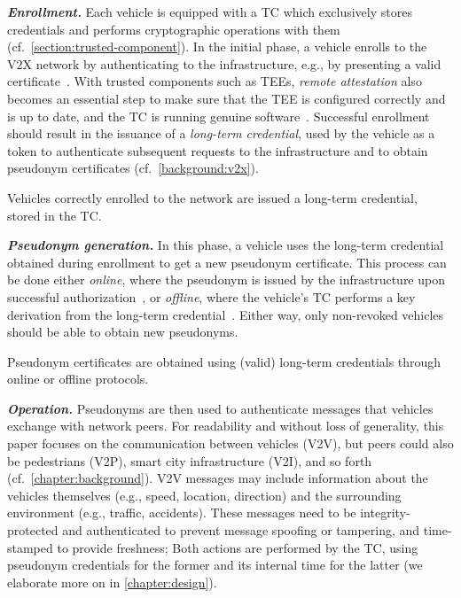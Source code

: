 \noindent\textbf{\emph{Enrollment.}} Each vehicle is equipped with a \ac{TC}
which exclusively stores credentials and performs cryptographic operations with
them (cf.~\cref{section:trusted-component}). In the initial phase, a vehicle
enrolls to the \ac{V2X} network by authenticating to the infrastructure, e.g.,
by presenting a valid certificate~\cite{etsi2022102941}. With trusted components
such as \acp{TEE}, \emph{remote attestation} also becomes an essential step to
make sure that the \ac{TEE} is configured correctly and is up to date, and the
\ac{TC} is running genuine software~\cite{schneider2022sok}. Successful
enrollment should result in the issuance of a \emph{long-term credential}, used
by the vehicle as a token to authenticate subsequent requests to the
infrastructure and to obtain pseudonym certificates (cf.~\cref{background:v2x}).
%
\begin{req}
    \label{req:enrollment}
 Vehicles correctly enrolled to the network are issued a long-term credential,
 stored in the \ac{TC}.
\end{req}
%

\noindent\textbf{\emph{Pseudonym generation.}} In this phase, a vehicle uses the
long-term credential obtained during enrollment to get a new pseudonym
certificate. This process can be done either \emph{online}, where the pseudonym
is issued by the infrastructure upon successful
authorization~\cite{etsi2022102941,brecht2018scms}, or \emph{offline}, where the
vehicle's \ac{TC} performs a key derivation from the long-term
credential~\cite{whitefield2017privacy,desmoulins2019practical}. Either way,
only non-revoked vehicles should be able to obtain new pseudonyms.
%
\begin{req}
    \label{req:pseudonym}
    Pseudonym certificates are obtained using (valid) long-term credentials
    through online or offline protocols. 
\end{req}
%
\noindent\textbf{\emph{Operation.}} Pseudonyms are then used to authenticate
messages that vehicles exchange with network peers. For readability and without
loss of generality, this paper focuses on the communication between vehicles
(\ac{V2V}), but peers could also be pedestrians (V2P), smart city infrastructure
(V2I), and so forth (cf.~\cref{chapter:background}). \ac{V2V} messages may
include information about the vehicles themselves (e.g., speed, location,
direction) and the surrounding environment (e.g., traffic, accidents). These
messages need to be integrity-protected and authenticated to prevent message
spoofing or tampering, and time-stamped to provide freshness; Both actions are
performed by the \ac{TC}, using pseudonym credentials for the former and its
internal time \funcnow{} for the latter (we elaborate more on \funcnow{} in
\cref{chapter:design}).

